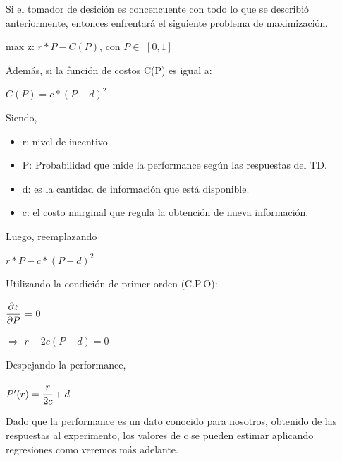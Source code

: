 \documentclass[11pt,letterpaper]{article}
\begin{document}
Si el tomador de desición es concencuente con todo lo que se describió anteriormente, entonces enfrentará el siguiente problema de maximización.

\begin{center}

    max z: \hspace{0,5cm}   $r*P - C(P)$, con $P \in$ $[0,1]$
    
\end{center}

Además, si la función de costos C(P) es igual a:

\begin{center}

    $C(P) = c*(P - d)^2$
\end{center}

Siendo,

\begin{itemize}
    \item r: nivel de incentivo.
    \item P: Probabilidad que mide la performance según las respuestas del TD.
    \item d: es la cantidad de información que está disponible.
    \item c: el costo marginal que regula la obtención de nueva información.
\end{itemize}
    
Luego, reemplazando

\begin{center}
    $r*P - c*(P - d)^2$
\end{center}

Utilizando la condición de primer orden (C.P.O):

\begin{center}
    $\cfrac{\partial z}{\partial P}$ = $0$
    
\vspace{0,5cm}
    
    $\Rightarrow$ $r - 2c(P-d) = 0$
    
\end{center}

Despejando la performance,

\begin{center}
    $P'(r) = \cfrac{r}{2c} + d$
\end{center}

Dado que la performance es un dato conocido para nosotros, obtenido de las respuestas al experimento, los valores de c se pueden estimar aplicando regresiones como veremos más adelante.
\end{document}
